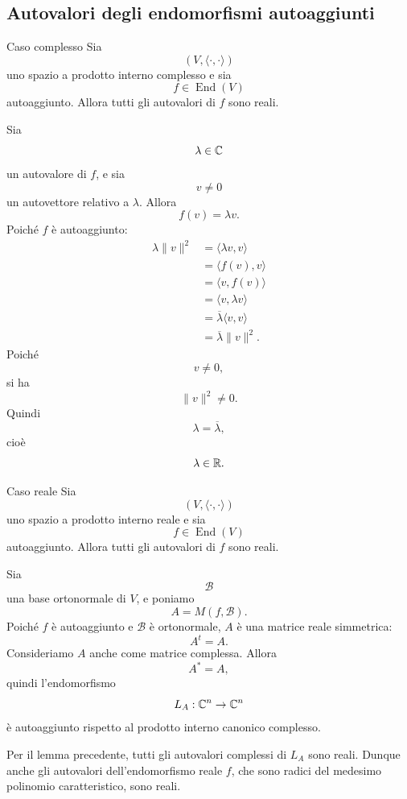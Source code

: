 \documentclass[a4paper]{article}
\begin{document}
\subsection{Autovalori degli endomorfismi autoaggiunti}

\begin{snippetlemma}{Caso complesso}
    Sia
    \[
        (V,\langle\cdot,\cdot\rangle)
    \]
    uno spazio a prodotto interno complesso e sia
    \[
        f\in\operatorname{End}(V)
    \]
    autoaggiunto. Allora tutti gli autovalori di \(f\) sono reali.
\end{snippetlemma}

\begin{snippetproof}{}
    Sia
    \[
        \lambda\in\mathbb{C}
    \]
    un autovalore di \(f\), e sia
    \[
        v\neq 0
    \]
    un autovettore relativo a \(\lambda\). Allora
    \[
        f(v)=\lambda v.
    \]
    Poiché \(f\) è autoaggiunto:
    \begin{align*}
        \lambda\|v\|^2
        &=
        \langle \lambda v,v\rangle\\
        &=
        \langle f(v),v\rangle\\
        &=
        \langle v,f(v)\rangle\\
        &=
        \langle v,\lambda v\rangle\\
        &=
        \overline{\lambda}\langle v,v\rangle\\
        &=
        \overline{\lambda}\|v\|^2.
    \end{align*}
    Poiché
    \[
        v\neq 0,
    \]
    si ha
    \[
        \|v\|^2\neq 0.
    \]
    Quindi
    \[
        \lambda=\overline{\lambda},
    \]
    cioè
    \[
        \lambda\in\mathbb{R}.
    \]
\end{snippetproof}

\begin{snippetlemma}{Caso reale}
    Sia
    \[
        (V,\langle\cdot,\cdot\rangle)
    \]
    uno spazio a prodotto interno reale e sia
    \[
        f\in\operatorname{End}(V)
    \]
    autoaggiunto. Allora tutti gli autovalori di \(f\) sono reali.
\end{snippetlemma}

\begin{snippetproof}{}
    Sia
    \[
        \mathcal{B}
    \]
    una base ortonormale di \(V\), e poniamo
    \[
        A=M(f,\mathcal{B}).
    \]
    Poiché \(f\) è autoaggiunto e \(\mathcal{B}\) è ortonormale, \(A\) è una matrice reale simmetrica:
    \[
        A^t=A.
    \]
    Consideriamo \(A\) anche come matrice complessa. Allora
    \[
        A^*=A,
    \]
    quindi l'endomorfismo
    \[
        L_A:\mathbb{C}^n\to\mathbb{C}^n
    \]
    è autoaggiunto rispetto al prodotto interno canonico complesso.

    Per il lemma precedente, tutti gli autovalori complessi di \(L_A\) sono reali. Dunque anche gli autovalori dell'endomorfismo reale \(f\), che sono radici del medesimo polinomio caratteristico, sono reali.
\end{snippetproof}
\end{document}
